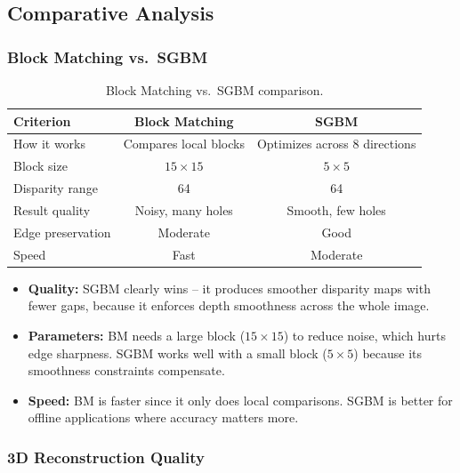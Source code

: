 \documentclass[a4paper,12pt]{article}
\begin{document}
\subsection{Comparative Analysis}

\subsubsection*{Block Matching vs.\ SGBM}

\begin{table}[htbp]
    \centering
    \begin{tabular}{|l|c|c|}
        \hline
        \textbf{Criterion} & \textbf{Block Matching} & \textbf{SGBM} \\ \hline
        How it works & Compares local blocks & Optimizes across 8 directions \\ \hline
        Block size & $15\times15$ & $5\times5$ \\ \hline
        Disparity range & 64 & 64 \\ \hline
        Result quality & Noisy, many holes & Smooth, few holes \\ \hline
        Edge preservation & Moderate & Good \\ \hline
        Speed & Fast & Moderate \\ \hline
    \end{tabular}
    \caption{Block Matching vs.\ SGBM comparison.}
    \label{tab:bm_vs_sgbm}
\end{table}

\begin{itemize}
    \item \textbf{Quality:} SGBM clearly wins -- it produces smoother disparity maps with fewer gaps, because it enforces depth smoothness across the whole image.
    \item \textbf{Parameters:} BM needs a large block ($15\times15$) to reduce noise, which hurts edge sharpness. SGBM works well with a small block ($5\times5$) because its smoothness constraints compensate.
    \item \textbf{Speed:} BM is faster since it only does local comparisons. SGBM is better for offline applications where accuracy matters more.
\end{itemize}

\subsubsection*{3D Reconstruction Quality}
\end{document}
